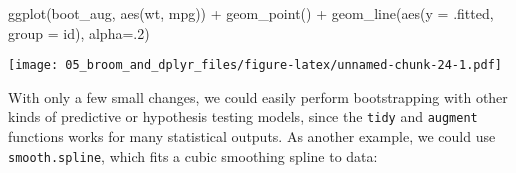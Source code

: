 \documentclass[
]{book}
\newenvironment{Shaded}{\begin{snugshade}}{\end{snugshade}}
\newcommand{\AttributeTok}[1]{\textcolor[rgb]{0.77,0.63,0.00}{#1}}
\newcommand{\ControlFlowTok}[1]{\textcolor[rgb]{0.13,0.29,0.53}{\textbf{#1}}}
\newcommand{\DecValTok}[1]{\textcolor[rgb]{0.00,0.00,0.81}{#1}}
\newcommand{\FloatTok}[1]{\textcolor[rgb]{0.00,0.00,0.81}{#1}}
\newcommand{\FunctionTok}[1]{\textcolor[rgb]{0.00,0.00,0.00}{#1}}
\newcommand{\NormalTok}[1]{#1}
\newcommand{\OtherTok}[1]{\textcolor[rgb]{0.56,0.35,0.01}{#1}}
\newcommand{\SpecialCharTok}[1]{\textcolor[rgb]{0.00,0.00,0.00}{#1}}
\begin{document}
\begin{Shaded}
\begin{Highlighting}[]
\FunctionTok{ggplot}\NormalTok{(boot\_aug, }\FunctionTok{aes}\NormalTok{(wt, mpg)) }\SpecialCharTok{+}
    \FunctionTok{geom\_point}\NormalTok{() }\SpecialCharTok{+}
    \FunctionTok{geom\_line}\NormalTok{(}\FunctionTok{aes}\NormalTok{(}\AttributeTok{y =}\NormalTok{ .fitted, }\AttributeTok{group =}\NormalTok{ id), }\AttributeTok{alpha=}\NormalTok{.}\DecValTok{2}\NormalTok{)}
\end{Highlighting}
\end{Shaded}

\texttt{[image: 05\_broom\_and\_dplyr\_files/figure-latex/unnamed-chunk-24-1.pdf]}

With only a few small changes, we could easily perform bootstrapping with other kinds of predictive or hypothesis testing models, since the \texttt{tidy} and \texttt{augment} functions works for many statistical outputs. As another example, we could use \texttt{smooth.spline}, which fits a cubic smoothing spline to data:

\begin{Shaded}
\end{Shaded}
\end{document}
